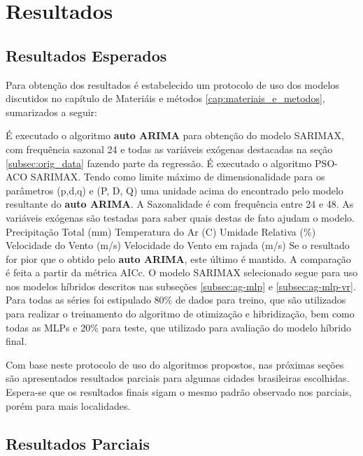 \chapter{Resultados}
\label{cap:resultados}

\section{Resultados Esperados}
\label{sec:protocolo_resultados}

Para obtenção dos resultados é estabelecido um protocolo de uso dos modelos discutidos no capítulo de Materiáis e métodos \ref{cap:materiais_e_metodos}, sumarizados a seguir:

\begin{outline}[enumerate]
    \1 É executado o algoritmo \textbf{auto ARIMA} para obtenção do modelo SARIMAX, com frequência sazonal 24 e todas as variáveis exógenas destacadas na seção \ref{subsec:orig_data} fazendo parte da regressão.
    \1 É executado o algoritmo PSO-ACO SARIMAX.
        \2 Tendo como limite máximo de dimensionalidade para os parâmetros (p,d,q) e (P, D, Q) uma unidade acima do encontrado pelo modelo resultante do \textbf{auto ARIMA}.
        \2 A Sazonalidade é com frequência entre 24 e 48.
        \2 As variáveis exógenas são testadas para saber quais destas de fato ajudam o modelo.
            \3 Precipitação Total (mm)
            \3 Temperatura do Ar (\textdegree{}C)
            \3 Umidade Relativa (\%)
            \3 Velocidade do Vento (m/s)
            \3 Velocidade do Vento em rajada (m/s)
        \2 Se o resultado for pior que o obtido pelo \textbf{auto ARIMA}, este último é mantido. A comparação é feita a partir da métrica AICc.
    \1 O modelo SARIMAX selecionado segue para uso nos modelos híbridos descritos nas subseções \ref{subsec:ag-mlp} e \ref{subsec:ag-mlp-vr}.
        \2 Para todas as séries foi estipulado 80\% de dados para treino, que são utilizados para realizar o treinamento do algoritmo de otimização e hibridização, bem como todas as MLPs e 20\% para teste, que utilizado para avaliação do modelo híbrido final.
\end{outline}

Com base neste protocolo de uso do algoritmos propostos, nas próximas seções são apresentados resultados parciais para algumas cidades brasileiras escolhidas. Espera-se que os resultados finais sigam o mesmo padrão observado nos parciais, porém para mais localidades.

\section{Resultados Parciais}

